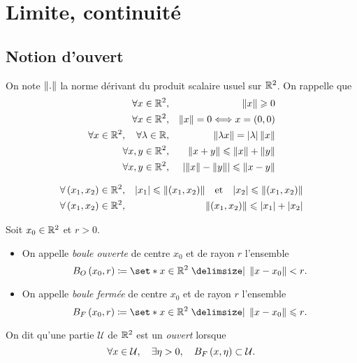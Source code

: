 \documentclass{magnolia}
\begin{document}
\magtoc

\section{Limite, continuité}



\subsection{Notion d'ouvert}

\begin{definition}
On note $\left\|.\right\|$ la norme dérivant du produit scalaire usuel sur $\mathbb{R}^2$.
On rappelle que
\begin{eqnarray*}
\forall x\in\mathbb{R}^2, & & \left\|x\right\|\geqslant 0\\
\forall x\in\mathbb{R}^2, & & \left\|x\right\|=0 \Longleftrightarrow x=\left(0,0\right)\\
\forall x\in\mathbb{R}^2 ,\quad \forall \lambda\in\mathbb{R}, & &
        \left\|\lambda x\right\|=\left|\lambda\right|\left\|x\right\|\\
\forall x,y\in\mathbb{R}^2, & & \left\|x+y\right\|\leqslant\left\|x\right\|+\left\|y\right\|\\
\forall x,y\in\mathbb{R}^2, & & \left|\left\|x\right\|-\left\|y\right\|\right|\leqslant\left\|x-y\right\|
\end{eqnarray*}
\end{definition}

\begin{proposition}
\begin{eqnarray*}
\forall \left(x_1,x_2\right)\in\mathbb{R}^2, & & \left|x_1\right|\leqslant\left\|\left(x_1,x_2\right)\right\| \quad\!\text{et}\quad\! 
       \left|x_2\right|\leqslant\left\|\left(x_1,x_2\right)\right\|\\
\forall \left(x_1,x_2\right)\in\mathbb{R}^2, & & \left\|\left(x_1,x_2\right)\right\|\leqslant\left|x_1\right|+\left|x_2\right|
\end{eqnarray*}
\end{proposition}

\begin{definition}
Soit $x_0\in\mathbb{R}^2$ et $r>0$.
\begin{itemize}
\item On appelle \emph{boule ouverte} de centre $x_0$ et de rayon $r$ l'ensemble
  \[B_O\p{x_0,r}\defeq\enstq{x\in\R^2}{\norme{x-x_0}<r}.\]
\item On appelle \emph{boule fermée} de centre $x_0$ et de rayon $r$ l'ensemble
  \[B_F\p{x_0,r}\defeq\enstq{x\in\R^2}{\norme{x-x_0}\leq r}.\]
\end{itemize}
\end{definition}

\begin{definition}
On dit qu'une partie $\mathcal{U}$ de $\mathbb{R}^2$ est un \emph{ouvert} lorsque
\[\forall x\in\mathcal{U} ,\quad \exists \eta>0 ,\quad
  B_F\left(x,\eta\right) \subset \mathcal{U}.\]
\end{definition}
\end{document}
